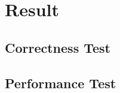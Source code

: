 




    

\chapter{Result}

\section{Correctness Test}

\section{Performance Test}


















